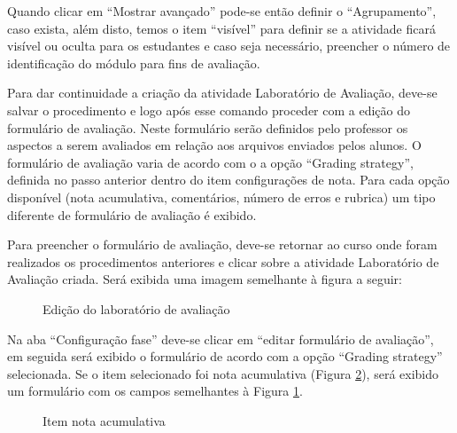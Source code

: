 Quando clicar em “Mostrar avançado” pode-se então definir o “Agrupamento”, caso exista, além disto, temos o item “visível” para definir se a atividade ficará visível ou oculta para os estudantes e caso seja necessário, preencher o número de identificação do módulo para fins de avaliação.

Para dar continuidade a criação da atividade Laboratório de Avaliação, deve-se salvar o procedimento e logo após esse comando proceder com a edição do formulário de avaliação. Neste formulário serão definidos pelo professor os aspectos a serem avaliados em relação aos arquivos enviados pelos alunos. O formulário de avaliação varia de acordo com o a opção “Grading strategy”, definida no passo anterior dentro do item configurações de nota. Para cada opção disponível (nota acumulativa, comentários, número de erros e rubrica) um tipo diferente de formulário de avaliação é exibido.

Para preencher o formulário de avaliação, deve-se retornar ao curso onde foram realizados os procedimentos anteriores e clicar sobre a atividade Laboratório de Avaliação criada. Será exibida uma imagem semelhante à figura a seguir:

\begin{figure}[htbp]
 \begin{center}
  \caption{Edição do laboratório de avaliação}
  \label{fig:edit_lab_ava}
 \end{center}
\end{figure}

Na aba “Configuração fase” deve-se clicar em “editar formulário de avaliação”, em seguida será exibido o formulário de acordo com a opção “Grading strategy” selecionada. Se o item selecionado foi nota acumulativa (Figura \ref{fig:item_nota_acumulativa}), será exibido um formulário com os campos semelhantes à Figura \ref{fig:edit_lab_ava}.

\begin{figure}[htbp]
 \begin{center}
  \caption{Item nota acumulativa}
  \label{fig:item_nota_acumulativa}
 \end{center}
\end{figure}

